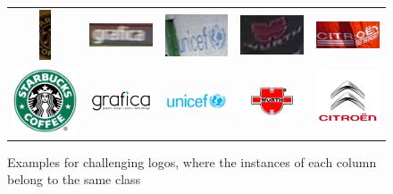 \begin{figure}
  \centering
  \begin{tabular}{ccccc}
  \includegraphics[height=15mm]{images/mt/challenge_1_a.png} &   \includegraphics[width=25mm]{images/mt/challenge_2_a.png}  & \includegraphics[width=25mm]{images/mt/challenge_3_a.png} &   \includegraphics[width=25mm]{images/mt/challenge_4_a.png} & \includegraphics[width=25mm]{images/mt/challenge_5_a.png} \\
    \includegraphics[width=25mm]{images/mt/challenge_1_b.png} &   \includegraphics[width=25mm]{images/mt/challenge_2_b.png}  & \includegraphics[width=25mm]{images/mt/challenge_3_b.png} &   \includegraphics[width=25mm]{images/mt/challenge_4_b.png}  & \includegraphics[width=25mm]{images/mt/challenge_5_b.png} 
    \end{tabular}
    \caption{Examples for challenging logos, where the instances of each column belong to the same class}
    \label{f:challenges}
\end{figure}
